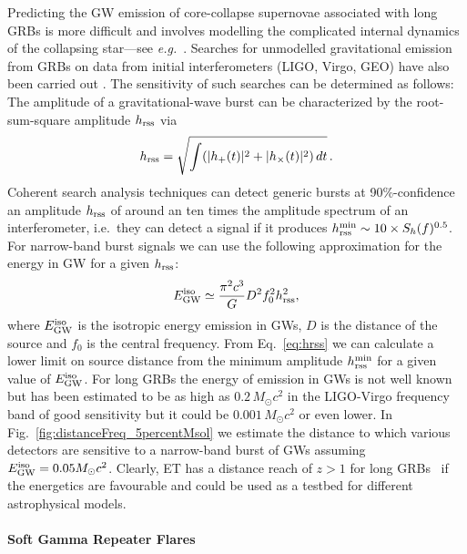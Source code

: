 Predicting the GW emission of core-collapse supernovae associated
with long GRBs is more difficult and involves modelling the complicated 
internal dynamics of the collapsing star---see \emph{e.g.}\ \cite{ott:09}.
Searches for unmodelled gravitational emission from GRBs
on data from initial interferometers (LIGO, Virgo, GEO) have also been
carried out \cite{LSC:GRB070201, LSC:S5GRBBurst}. The sensitivity of
such searches can be determined as follows:
The amplitude of a gravitational-wave burst can be characterized by
the root-sum-square amplitude $h_{\rm rss}$ via
\begin{equation}
h_{\rm rss} = \sqrt{\int (|h_+(t)|^2 + |h_\times(t)|^2) \, dt} \,.
\label{eq:hrss}
\end{equation}
Coherent search analysis techniques \cite{LSC:S5GRBBurst} can detect 
generic bursts at 90\%-confidence an amplitude $h_{\rm rss}$ of
around an ten times the amplitude spectrum of an interferometer, 
i.e.\  they can detect a signal if it produces $h_{\rm rss}^{\rm min} \sim 
10 \times S_{h}(f)^{0.5}$.  For narrow-band burst signals we can 
use the following approximation for the energy in GW for a given
$h_{\rm rss}$:
\begin{equation}
E^{\rm iso}_{\rm GW} \simeq \frac{\pi^2 c^3}{G} D^2 f_{0}^{2} h_{\rm rss}^{2},
\end{equation}
where $E^{\rm iso}_{\rm GW}$ is the isotropic energy emission in GWs,
$D$ is the distance of the source and $f_0$ is the central frequency. 
From Eq.~\ref{eq:hrss} we can calculate a lower limit on source distance from
the minimum amplitude $h_{\rm rss}^{\rm min}$ for a given value of 
$E^{\rm iso}_{\rm GW}$.
For long GRBs the energy of emission in GWs is not well known
but has been estimated to be as high as $0.2\, M_{\odot} c^2$ in the LIGO-Virgo
frequency band of good sensitivity \cite{vanPutten:grb} but it could be
$0.001\,M_\odot c^2$ \cite{davies:2002,king:2005,piro:07} or even lower.
In Fig.~\ref{fig:distanceFreq_5percentMsol} we estimate the distance to which
various detectors are sensitive to a narrow-band burst of GWs
assuming $E^{\rm iso}_{\rm GW} = 0.05 M_{\odot} c^2$.
Clearly, ET has a distance reach of $z>1$ for long GRBs~\cite{springerlink:10.1007/s10714-010-1019-z} if
the energetics are favourable and could be used as a testbed for
different astrophysical models.

\paragraph*{Soft Gamma Repeater Flares}
\label{sec:SGR}

